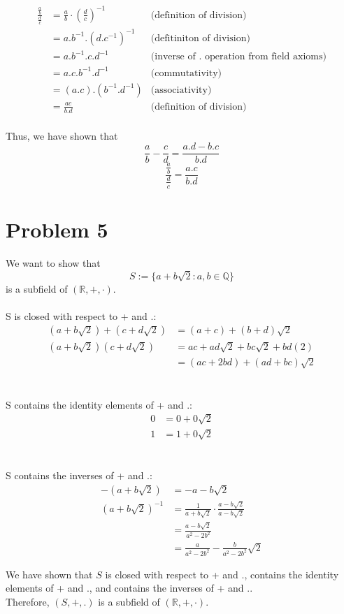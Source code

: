 \documentclass{article}
\begin{document}
\begin{align*}
   \frac{\frac{a}{b}}{\frac{d}{c}} &= \frac{a}{b} \cdot \left(\frac{d}{c}\right)^{-1} & \text{(definition of division)} \\
                                   &= a.b^{-1}.(d.c^{-1})^{-1} & \text{(defitiniton of division)} \\
                                   &= a.b^{-1}.c.d^{-1} & \text{(inverse of . operation from field axioms)} \\
                                   &= a.c.b^{-1}.d^{-1} & \text{(commutativity)} \\
                                   &= (a.c).(b^{-1}.d^{-1}) & \text{(associativity)} \\
                                   &= \frac{ac}{b.d} & \text{(definition of division)} \\
\end{align*}

Thus, we have shown that
\[
   \frac{a}{b} - \frac{c}{d} = \frac{a.d - b.c}{b.d}
\]
\[
   \frac{\frac{a}{b}}{\frac{d}{c}} = \frac{a.c}{b.d}
\]

\section*{Problem 5}

We want to show that
\[
   S := \{a + b\sqrt{2} : a, b \in \mathbb{Q}\}
\]
is a subfield of \((\mathbb{R}, +, \cdot)\). \\
\\
S is closed with respect to + and .:
\begin{align*}
   (a + b\sqrt{2}) + (c + d\sqrt{2}) &= (a + c) + (b + d)\sqrt{2} \\
   (a + b\sqrt{2})(c + d\sqrt{2}) &= ac + ad\sqrt{2} + bc\sqrt{2} + bd(2) \\
                                   &= (ac + 2bd) + (ad + bc)\sqrt{2}
\end{align*}
\\
\\
S contains the identity elements of + and .:
\begin{align*}
   0 &= 0 + 0\sqrt{2} \\
   1 &= 1 + 0\sqrt{2}
\end{align*}
\\
\\
S contains the inverses of + and .:
\begin{align*}
   -(a + b\sqrt{2}) &= -a - b\sqrt{2} \\
   (a + b\sqrt{2})^{-1} &= \frac{1}{a + b\sqrt{2}} \cdot \frac{a - b\sqrt{2}}{a - b\sqrt{2}} \\
                        &= \frac{a - b\sqrt{2}}{a^2 - 2b^2} \\
                        &= \frac{a}{a^2 - 2b^2} - \frac{b}{a^2 - 2b^2}\sqrt{2}
\end{align*}

We have shown that \(S\) is closed with respect to + and ., contains the identity elements of + and ., and contains the inverses of + and .. \\
Therefore, \((S, +, .)\) is a subfield of \((\mathbb{R}, +, \cdot)\).
\end{document}
